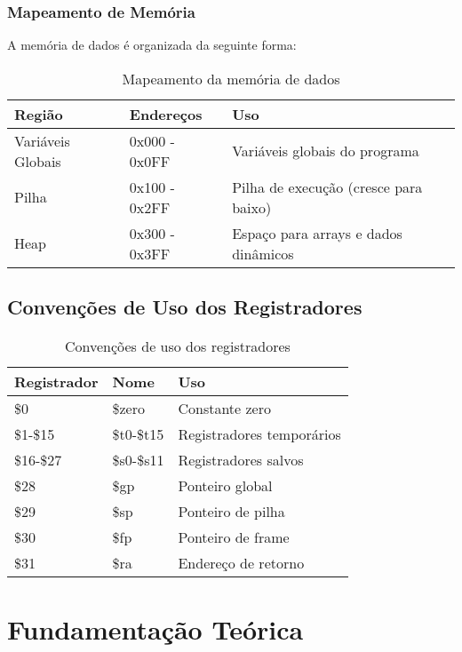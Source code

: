 \documentclass[
	12pt,				%
	oneside,
	a4paper,			%
	english,			%
	french,				%
	spanish,			%
	brazil,				%
	]{abntex2}
\begin{document}
\subsection{Mapeamento de Memória}
A memória de dados é organizada da seguinte forma:

\begin{table}[H]
\centering
\caption{Mapeamento da memória de dados}
\begin{tabular}{|l|l|l|}
\hline
\textbf{Região} & \textbf{Endereços} & \textbf{Uso} \\
\hline
Variáveis Globais & 0x000 - 0x0FF & Variáveis globais do programa \\
\hline
Pilha & 0x100 - 0x2FF & Pilha de execução (cresce para baixo) \\
\hline
Heap & 0x300 - 0x3FF & Espaço para arrays e dados dinâmicos \\
\hline
\end{tabular}
\end{table}

\section{Convenções de Uso dos Registradores}

\begin{table}[H]
\centering
\caption{Convenções de uso dos registradores}
\begin{tabular}{|l|l|l|}
\hline
\textbf{Registrador} & \textbf{Nome} & \textbf{Uso} \\
\hline
\$0 & \$zero & Constante zero \\
\hline
\$1-\$15 & \$t0-\$t15 & Registradores temporários \\
\hline
\$16-\$27 & \$s0-\$s11 & Registradores salvos \\
\hline
\$28 & \$gp & Ponteiro global \\
\hline
\$29 & \$sp & Ponteiro de pilha \\
\hline
\$30 & \$fp & Ponteiro de frame \\
\hline
\$31 & \$ra & Endereço de retorno \\
\hline
\end{tabular}
\end{table}

\chapter{Fundamentação Teórica}
\end{document}
